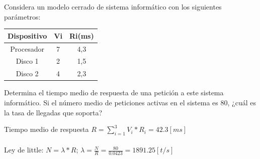 Considera un modelo cerrado de sistema informático con los siguientes parámetros:
\begin{table}[H]\centering
\begin{tabular}{|c|c|c|}
\hline
\textbf{Dispositivo} & \textbf{Vi} & \textbf{Ri(ms)} \\ \hline
Procesador  & 7  & 4,3    \\ \hline
Disco 1     & 2  & 1,5    \\ \hline
Disco 2     & 4  & 2,3    \\ \hline
\end{tabular}
\end{table}
Determina el tiempo medio de respuesta de una petición a este sistema informático. Si el número medio de peticiones activas en el sistema es 80, ¿cuál es la tasa de llegadas que soporta?
\begin{tcolorbox}[colback=white,colframe=cyan!50!black,fonttitle=\bfseries]
Tiempo medio de respuesta $R=\sum_{i=1}^{3}V_i*R_i=42.3[ms]$\\\\
Ley de little: $N = \lambda * R$; $\lambda = \frac{N}{R}=\frac{80}{0.0423}=1891.25[t/s]$
\end{tcolorbox}
